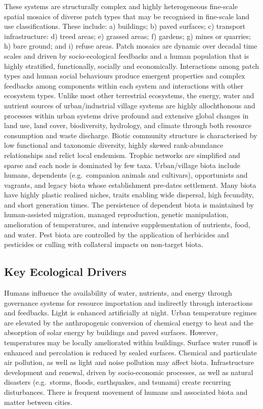 \documentclass[
  letterpaper,
  DIV=11,
  numbers=noendperiod]{scrartcl}
\begin{document}
These systems are structurally complex and highly heterogeneous
fine-scale spatial mosaics of diverse patch types that may be recognised
in fine-scale land use classifications. These include: a) buildings; b)
paved surfaces; c) transport infrastructure: d) treed areas; e) grassed
areas; f) gardens; g) mines or quarries; h) bare ground; and i) refuse
areas. Patch mosaics are dynamic over decadal time scales and driven by
socio-ecological feedbacks and a human population that is highly
stratified, functionally, socially and economically. Interactions among
patch types and human social behaviours produce emergent properties and
complex feedbacks among components within each system and interactions
with other ecosystem types. Unlike most other terrestrial ecosystems,
the energy, water and nutrient sources of urban/industrial village
systems are highly allochthonous and processes within urban systems
drive profound and extensive global changes in land use, land cover,
biodiversity, hydrology, and climate through both resource consumption
and waste discharge. Biotic community structure is characterised by low
functional and taxonomic diversity, highly skewed rank-abundance
relationships and relict local endemism. Trophic networks are simplified
and sparse and each node is dominated by few taxa. Urban/village biota
include humans, dependents (e.g.~companion animals and cultivars),
opportunists and vagrants, and legacy biota whose establishment
pre-dates settlement. Many biota have highly plastic realised niches,
traits enabling wide dispersal, high fecundity, and short generation
times. The persistence of dependent biota is maintained by
human-assisted migration, managed reproduction, genetic manipulation,
amelioration of temperatures, and intensive supplementation of
nutrients, food, and water. Pest biota are controlled by the application
of herbicides and pesticides or culling with collateral impacts on
non-target biota.

\subsection{Key Ecological Drivers}\label{key-ecological-drivers-101}

Humans influence the availability of water, nutrients, and energy
through governance systems for resource importation and indirectly
through interactions and feedbacks. Light is enhanced artificially at
night. Urban temperature regimes are elevated by the anthropogenic
conversion of chemical energy to heat and the absorption of solar energy
by buildings and paved surfaces. However, temperatures may be locally
ameliorated within buildings. Surface water runoff is enhanced and
percolation is reduced by sealed surfaces. Chemical and particulate air
pollution, as well as light and noise pollution may affect biota.
Infrastructure development and renewal, driven by socio-economic
processes, as well as natural disasters (e.g.~storms, floods,
earthquakes, and tsunami) create recurring disturbances. There is
frequent movement of humans and associated biota and matter between
cities.
\end{document}
